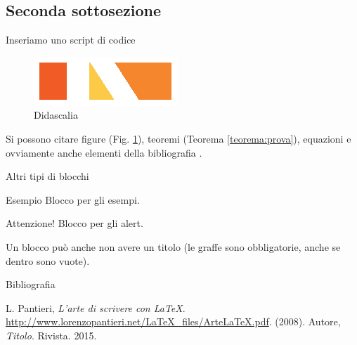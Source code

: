 \documentclass[xcolor={dvipsnames}]{beamer}
\begin{document}

\subsection{Seconda sottosezione}
\begin{frame}[fragile]{Inseriamo uno script di codice}

  \begin{figure}[h]
  \includegraphics[height=0.3\textheight]{AIM.eps}
  \caption{Didascalia}
  \label{fig:AIM} %
  \end{figure}
  
  Si possono citare figure (Fig. \ref{fig:AIM}), teoremi (Teorema \ref{teorema:prova}), equazioni e ovviamente anche elementi della bibliografia \cite{artelatex}.
\end{frame}


\begin{frame}{Altri tipi di blocchi}
    \begin{exampleblock}{Esempio}
    Blocco per gli esempi.
    \end{exampleblock}
    
    \begin{alertblock}{Attenzione!}
    Blocco per gli alert.
    \end{alertblock}
    
    \begin{block}{}
    Un blocco può anche non avere un titolo (le graffe sono obbligatorie, anche se dentro sono vuote).
    \end{block}

\end{frame}


\begin{frame}{Bibliografia}
    \begin{thebibliography}{artelatex}
	 L. Pantieri, \emph{L'arte di scrivere con \LaTeX}. \url{http://www.lorenzopantieri.net/LaTeX_files/ArteLaTeX.pdf}. (2008).
	 Autore, \emph{Titolo}. Rivista. 2015.
    \end{thebibliography}
\end{frame}
\end{document}
